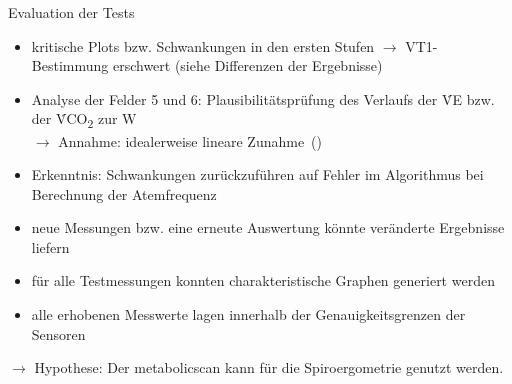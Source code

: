 \documentclass[colorBG,slideColor,8pt]{beamer}
\begin{document}
\begin{frame}{Evaluation der Tests}
\begin{itemize}
	\item kritische Plots bzw. Schwankungen in den ersten Stufen $\rightarrow$ VT1-Bestimmung erschwert (siehe Differenzen der Ergebnisse)
	\item Analyse der Felder 5 und 6: Plausibilitätsprüfung des Verlaufs der \.{V}E bzw. der \.{V}CO\textsubscript{2} zur W\\$\rightarrow$ Annahme: idealerweise lineare Zunahme~(\cite{Ruehle.2012})
	\item Erkenntnis: Schwankungen zurückzuführen auf Fehler im Algorithmus bei Berechnung der Atemfrequenz
	\item neue Messungen bzw. eine erneute Auswertung könnte veränderte Ergebnisse liefern
	\item für alle Testmessungen konnten charakteristische Graphen generiert werden
	\item alle erhobenen Messwerte lagen innerhalb der Genauigkeitsgrenzen der Sensoren
\end{itemize}
\begin{center}
\vspace{3ex}
$\rightarrow$ Hypothese: Der metabolicscan kann für die Spiroergometrie genutzt werden.
\end{center}
\end{frame}
\end{document}
